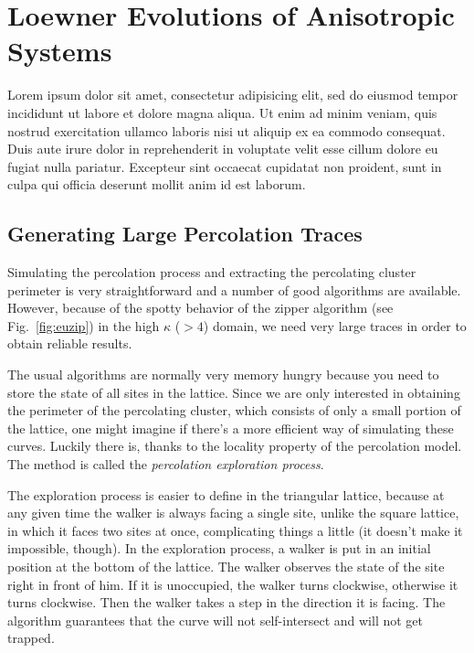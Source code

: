\chapter{Loewner Evolutions of Anisotropic Systems}
\label{ch6-asle}

Lorem ipsum dolor sit amet, consectetur adipisicing elit, sed do eiusmod tempor
incididunt ut labore et dolore magna aliqua. Ut enim ad minim veniam, quis
nostrud exercitation ullamco laboris nisi ut aliquip ex ea commodo consequat.
Duis aute irure dolor in reprehenderit in voluptate velit esse cillum dolore eu
fugiat nulla pariatur. Excepteur sint occaecat cupidatat non proident, sunt in
culpa qui officia deserunt mollit anim id est laborum.

\section{Generating Large Percolation Traces}
\label{sec:hulls}

Simulating the percolation process and extracting the percolating cluster
perimeter is very straightforward and a number of good algorithms are
available. However, because of the spotty behavior of the zipper algorithm
(see Fig.~\ref{fig:euzip}) in the high $\kappa$ ($>4$) domain, we need very
large traces in order to obtain reliable results.

The usual algorithms are normally very memory hungry because you need to store
the state of all sites in the lattice. Since we are only interested in
obtaining the perimeter of the percolating cluster, which consists of only a
small portion of the lattice, one might imagine if there's a more efficient way
of simulating these curves. Luckily there is, thanks to the locality property
of the percolation model. The method is called the \textit{percolation
exploration process}.

The exploration process is easier to define in the triangular lattice, because
at any given time the walker is always facing a single site, unlike the square
lattice, in which it faces two sites at once, complicating things a little (it
doesn't make it impossible, though). In the exploration process, a walker is
put in an initial position at the bottom of the lattice. The walker observes
the state of the site right in front of him. If it is unoccupied, the walker
turns clockwise, otherwise it turns clockwise. Then the walker takes a step in
the direction it is facing. The algorithm guarantees that the curve will not
self-intersect and will not get trapped.

